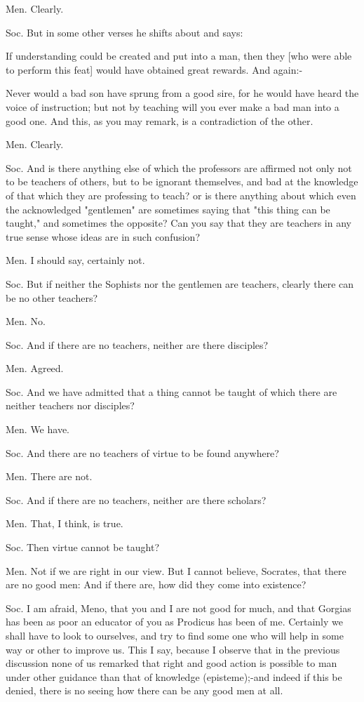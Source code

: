 Men. Clearly. 

Soc. But in some other verses he shifts about and says: 

If understanding could be created and put into a man, then they [who
were able to perform this feat] would have obtained great rewards.
And again:- 

Never would a bad son have sprung from a good sire, for he would have
heard the voice of instruction; but not by teaching will you ever
make a bad man into a good one. And this, as you may remark, is a
contradiction of the other. 

Men. Clearly. 

Soc. And is there anything else of which the professors are affirmed
not only not to be teachers of others, but to be ignorant themselves,
and bad at the knowledge of that which they are professing to teach?
or is there anything about which even the acknowledged "gentlemen"
are sometimes saying that "this thing can be taught," and sometimes
the opposite? Can you say that they are teachers in any true sense
whose ideas are in such confusion? 

Men. I should say, certainly not. 

Soc. But if neither the Sophists nor the gentlemen are teachers, clearly
there can be no other teachers? 

Men. No. 

Soc. And if there are no teachers, neither are there disciples?

Men. Agreed. 

Soc. And we have admitted that a thing cannot be taught of which there
are neither teachers nor disciples? 

Men. We have. 

Soc. And there are no teachers of virtue to be found anywhere?

Men. There are not. 

Soc. And if there are no teachers, neither are there scholars?

Men. That, I think, is true. 

Soc. Then virtue cannot be taught? 

Men. Not if we are right in our view. But I cannot believe, Socrates,
that there are no good men: And if there are, how did they come into
existence? 

Soc. I am afraid, Meno, that you and I are not good for much, and
that Gorgias has been as poor an educator of you as Prodicus has been
of me. Certainly we shall have to look to ourselves, and try to find
some one who will help in some way or other to improve us. This I
say, because I observe that in the previous discussion none of us
remarked that right and good action is possible to man under other
guidance than that of knowledge (episteme);-and indeed if this be
denied, there is no seeing how there can be any good men at all.

